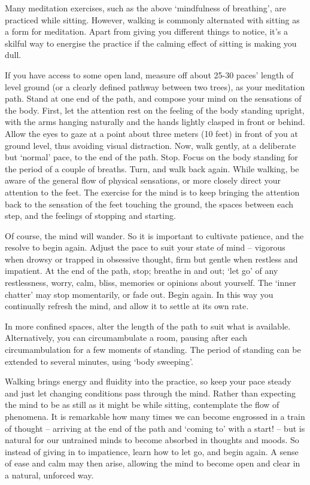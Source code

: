 
Many meditation exercises, such as the above `mindfulness of breathing',
are practiced while sitting. However, walking is commonly alternated
with sitting as a form for meditation. Apart from giving you different
things to notice, it's a skilful way to energise the practice if the
calming effect of sitting is making you dull.

If you have access to some open land, measure off about 25-30 paces'
length of level ground (or a clearly defined pathway between two trees),
as your meditation path. Stand at one end of the path, and compose your
mind on the sensations of the body. First, let the attention rest on the
feeling of the body standing upright, with the arms hanging naturally
and the hands lightly clasped in front or behind. Allow the eyes to gaze
at a point about three meters (10 feet) in front of you at ground
level, thus avoiding visual distraction. Now, walk gently, at a
deliberate but `normal' pace, to the end of the path. Stop. Focus on the
body standing for the period of a couple of breaths. Turn, and walk back
again. While walking, be aware of the general flow of physical
sensations, or more closely direct your attention to the feet. The
exercise for the mind is to keep bringing the attention back to the
sensation of the feet touching the ground, the spaces between each step,
and the feelings of stopping and starting.

Of course, the mind will wander. So it is important to cultivate
patience, and the resolve to begin again. Adjust the pace to suit your
state of mind -- vigorous when drowsy or trapped in obsessive thought,
firm but gentle when restless and impatient. At the end of the path,
stop; breathe in and out; `let go' of any restlessness, worry, calm,
bliss, memories or opinions about yourself. The `inner chatter' may stop
momentarily, or fade out. Begin again. In this way you continually
refresh the mind, and allow it to settle at its own rate.

\vspace*{-0.5\onelineskip}
In more confined spaces, alter the length of the path to suit what is
available. Alternatively, you can circumambulate a room, pausing after
each circumambulation for a few moments of standing. The period of
standing can be extended to several minutes, using `body sweeping'.

\vspace*{-0.5\onelineskip}
Walking brings energy and fluidity into the practice, so keep your pace
steady and just let changing conditions pass through the mind. Rather
than expecting the mind to be as still as it might be while sitting,
contemplate the flow of phenomena. It is remarkable how many times we
can become engrossed in a train of thought -- arriving at the end of the
path and `coming to' with a start! -- but is natural for our untrained
minds to become absorbed in thoughts and moods. So instead of giving in
to impatience, learn how to let go, and begin again. A sense of ease and
calm may then arise, allowing the mind to become open and clear in a
natural, unforced way.

